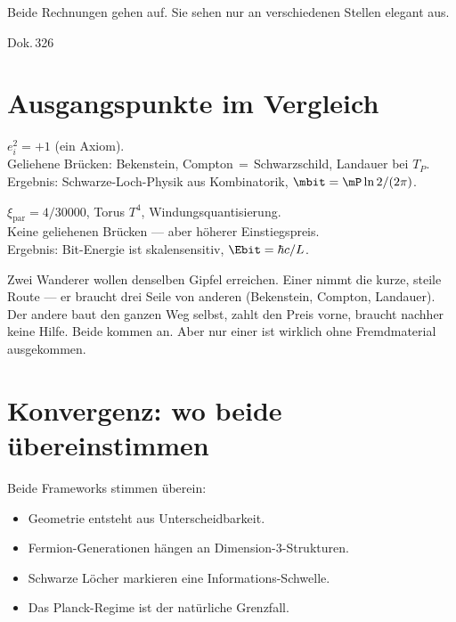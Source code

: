 \label{ch:vergleich_matzke_ffgft}

\epigraph{Beide Rechnungen gehen auf.
Sie sehen nur an verschiedenen Stellen elegant aus.}{Dok.\,326}

\section{Ausgangspunkte im Vergleich}

\begin{matzbox}
 $e_i^2 = +1$ (ein Axiom).\\
Geliehene Brücken: Bekenstein, Compton$\,{=}\,$Schwarzschild, Landauer bei $T_P$.\\
Ergebnis: Schwarze-Loch-Physik aus Kombinatorik, $\mbit = \mP\ln 2/(2\pi)$.
\end{matzbox}

\begin{ffgftbox}[FFGFT]
 $\xi_{\text{par}} = 4/30000$, Torus $T^4$, Windungsquantisierung.\\
Keine geliehenen Brücken --- aber höherer Einstiegspreis.\\
Ergebnis: Bit-Energie ist skalensensitiv, $\Ebit = \hbar c / L$. 
\end{ffgftbox}

\begin{laierspur}
Zwei Wanderer wollen denselben Gipfel erreichen. Einer nimmt die kurze,
steile Route --- er braucht drei Seile von anderen (Bekenstein, Compton, Landauer).
Der andere baut den ganzen Weg selbst, zahlt den Preis vorne, braucht nachher
keine Hilfe. Beide kommen an. Aber nur einer ist wirklich ohne Fremdmaterial
ausgekommen.
\end{laierspur}

\section{Konvergenz: wo beide übereinstimmen}

Beide Frameworks stimmen überein: 
\begin{itemize}
  \item Geometrie entsteht aus Unterscheidbarkeit.
  \item Fermion-Generationen hängen an Dimension-3-Strukturen.
  \item Schwarze Löcher markieren eine Informations-Schwelle.
  \item Das Planck-Regime ist der natürliche Grenzfall.
\end{itemize}

